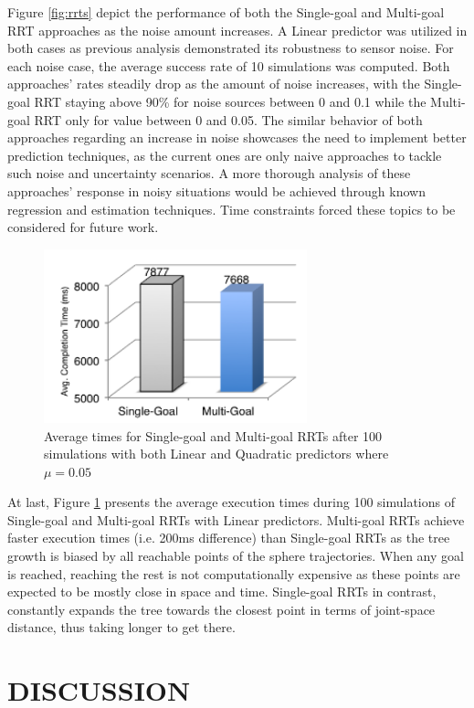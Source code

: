 \documentclass[letterpaper, 10 pt, conference]{ieeeconf}  %
\begin{document}
Figure \ref{fig:rrts} depict the performance of both the Single-goal and
Multi-goal RRT approaches as the noise amount increases. A Linear
predictor was utilized in both cases as previous analysis demonstrated
its robustness to sensor noise. For each noise case, the average success
rate of 10 simulations was computed. Both approaches’ rates steadily
drop as the amount of noise increases, with the Single-goal RRT staying
above 90\% for noise sources between 0 and 0.1 while the Multi-goal RRT
only for value between 0 and 0.05. The similar behavior of both
approaches regarding an increase in noise showcases the need to
implement better prediction techniques, as the current ones are only
naive approaches to tackle such noise and uncertainty scenarios. A more
thorough analysis of these approaches’ response in noisy situations
would be achieved through known regression and estimation techniques.
Time constraints forced these topics to be considered for future work.

\begin{figure}
        \centering
        \includegraphics[width=3in]{fig/runtimes}
        \caption{Average times for Single-goal and
        Multi-goal RRTs after 100 simulations with both Linear and
      Quadratic predictors where $\mu = 0.05$}\label{fig:runtimes}
\end{figure}

At last, Figure \ref{fig:runtimes} presents the average execution times
during 100 simulations of Single-goal and Multi-goal RRTs with Linear
predictors. Multi-goal RRTs achieve faster execution times (i.e. 200ms
difference) than Single-goal RRTs as the tree growth is biased by all
reachable points of the sphere trajectories. When any goal is reached,
reaching the rest is not computationally expensive as these points are
expected to be mostly close in space and time. Single-goal RRTs in
contrast, constantly expands the tree towards the closest point in terms
of joint-space distance, thus taking longer to get there.

\section{DISCUSSION}
\end{document}
